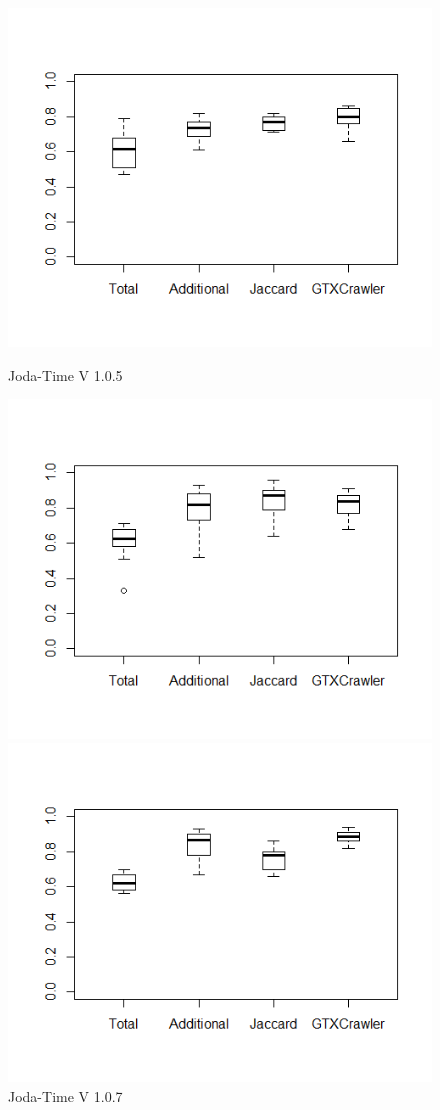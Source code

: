 \begin{figure}[!hb]	
	\includegraphics[width=0.95\linewidth]{./jfree3.png}
	\caption*{Joda-Time V 1.0.5}
	\label{fig:jfree3}
	\endminipage\hfill
	\includegraphics[width=0.95\linewidth]{./jfree4.png}
	\caption*{Joda-Time V 1.0.7}
	\label{fig:jfree4}
	\endminipage\hfill
	\includegraphics[width=0.95\linewidth]{./jfree5.png}

\end{figure}
